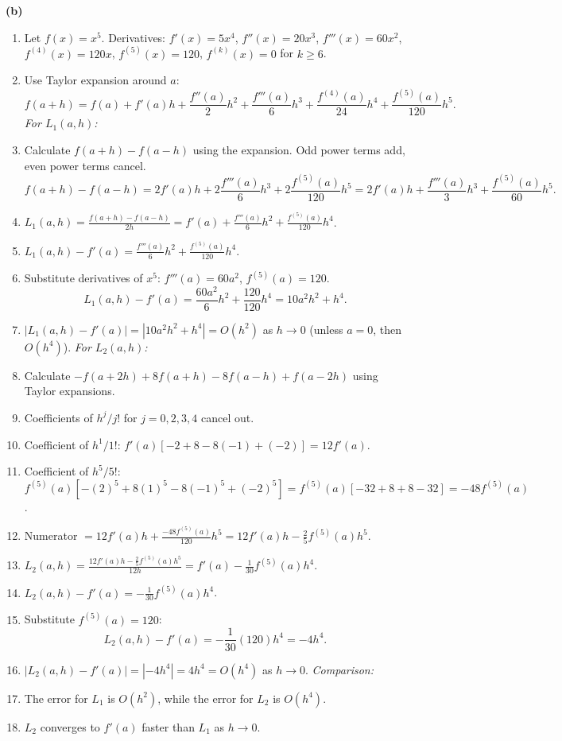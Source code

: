 \documentclass{article}
\newcommand{\abs}[1]{\left|#1\right|}
\begin{document}
\textbf{(b)}
\begin{enumerate}
    \item Let \(f(x) = x^5\). Derivatives: \(f'(x) = 5x^4\), \(f''(x) = 20x^3\), \(f'''(x) = 60x^2\), \(f^{(4)}(x) = 120x\), \(f^{(5)}(x) = 120\), \(f^{(k)}(x) = 0\) for \(k \ge 6\).
    \item Use Taylor expansion around \(a\):
    \[ f(a+h) = f(a) + f'(a)h + \frac{f''(a)}{2}h^2 + \frac{f'''(a)}{6}h^3 + \frac{f^{(4)}(a)}{24}h^4 + \frac{f^{(5)}(a)}{120}h^5. \]
    \textit{For \(L_1(a,h)\):}
    \item Calculate \(f(a+h) - f(a-h)\) using the expansion. Odd power terms add, even power terms cancel.
    \[ f(a+h) - f(a-h) = 2f'(a)h + 2\frac{f'''(a)}{6}h^3 + 2\frac{f^{(5)}(a)}{120}h^5 = 2f'(a)h + \frac{f'''(a)}{3}h^3 + \frac{f^{(5)}(a)}{60}h^5. \]
    \item \(L_1(a,h) = \frac{f(a+h) - f(a-h)}{2h} = f'(a) + \frac{f'''(a)}{6}h^2 + \frac{f^{(5)}(a)}{120}h^4\).
    \item \(L_1(a,h) - f'(a) = \frac{f'''(a)}{6}h^2 + \frac{f^{(5)}(a)}{120}h^4\).
    \item Substitute derivatives of \(x^5\): \(f'''(a) = 60a^2\), \(f^{(5)}(a) = 120\).
    \[ L_1(a,h) - f'(a) = \frac{60a^2}{6}h^2 + \frac{120}{120}h^4 = 10a^2 h^2 + h^4. \]
    \item \(\abs{L_1(a,h) - f'(a)} = \abs{10a^2 h^2 + h^4} = O(h^2)\) as \(h \to 0\) (unless \(a=0\), then \(O(h^4)\)).
    \textit{For \(L_2(a,h)\):}
    \item Calculate \(-f(a+2h)+8f(a+h)-8f(a-h)+f(a-2h)\) using Taylor expansions.
    \item Coefficients of \(h^j/j!\) for \(j=0, 2, 3, 4\) cancel out.
    \item Coefficient of \(h^1/1!\): \(f'(a)[-2+8-8(-1)+(-2)] = 12 f'(a)\).
    \item Coefficient of \(h^5/5!\): \(f^{(5)}(a)[-(2)^5+8(1)^5-8(-1)^5+(-2)^5] = f^{(5)}(a)[-32+8+8-32] = -48 f^{(5)}(a)\).
    \item Numerator \( = 12 f'(a) h + \frac{-48 f^{(5)}(a)}{120} h^5 = 12 f'(a) h - \frac{2}{5} f^{(5)}(a) h^5\).
    \item \(L_2(a,h) = \frac{12 f'(a) h - \frac{2}{5} f^{(5)}(a) h^5}{12h} = f'(a) - \frac{1}{30} f^{(5)}(a) h^4\).
    \item \(L_2(a,h) - f'(a) = - \frac{1}{30} f^{(5)}(a) h^4\).
    \item Substitute \(f^{(5)}(a) = 120\):
    \[ L_2(a,h) - f'(a) = - \frac{1}{30} (120) h^4 = -4 h^4. \]
    \item \(\abs{L_2(a,h) - f'(a)} = \abs{-4h^4} = 4h^4 = O(h^4)\) as \(h \to 0\).
    \textit{Comparison:}
    \item The error for \(L_1\) is \(O(h^2)\), while the error for \(L_2\) is \(O(h^4)\).
    \item \(L_2\) converges to \(f'(a)\) faster than \(L_1\) as \(h \to 0\).
\end{enumerate}
\end{document}
